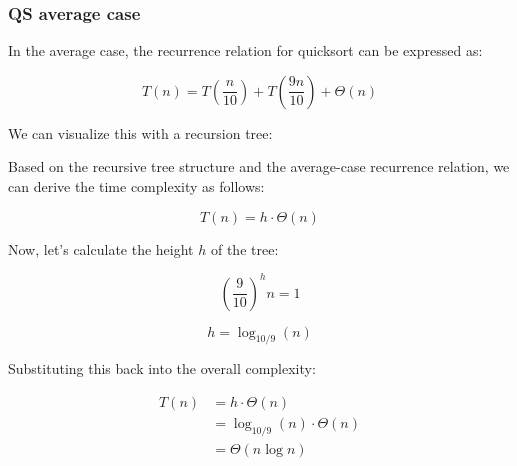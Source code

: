     \subsubsection{QS average case}
    \begin{definition}
        In the average case, the recurrence relation for quicksort can be expressed as:

        \[
        T(n) = T\left(\frac{n}{10}\right) + T\left(\frac{9n}{10}\right) + \Theta(n)
        \]

        \noindent We can visualize this with a recursion tree:


        \noindent Based on the recursive tree structure and the average-case recurrence relation, we can derive the time complexity as follows:

        \[
        T(n) = h \cdot \Theta(n)
        \]

        \noindent Now, let's calculate the height \( h \) of the tree:

        \[
        \left(\frac{9}{10}\right)^h n = 1
        \]

        \[
        h = \log_{10/9}(n) 
        \]

        \noindent Substituting this back into the overall complexity:

        \begin{align*}
        T(n) &= h \cdot \Theta(n) \\
            &= \log_{10/9}(n) \cdot \Theta(n) \\
            &= \Theta(n \log n)
        \end{align*}

    \end{definition}

